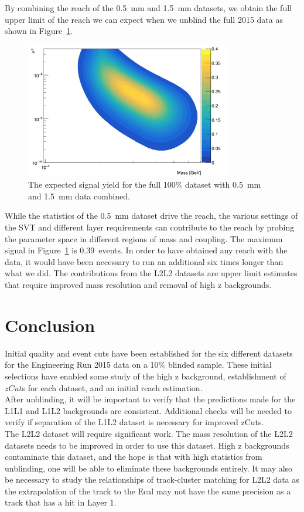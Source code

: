 \documentclass[twoside]{article}
\begin{document}
By combining the reach of the 0.5~mm and 1.5~mm datasets, we obtain the full upper limit of the reach we can expect when we unblind the full 2015 data as shown in Figure~\ref{fig:reachall}.

\begin{figure}[H]
  \centering
     \includegraphics[width=0.8\textwidth]{plots/reachall.png}
  \caption{The expected signal yield for the full 100$\%$ dataset with 0.5~mm and 1.5~mm data combined.}
  \label{fig:reachall}
\end{figure} 

While the statistics of the 0.5~mm dataset drive the reach, the various settings of the SVT and different layer requirements can contribute to the reach by probing the parameter space in different regions of mass and coupling. The maximum signal in  Figure~\ref{fig:reachall} is 0.39~events. In order to have obtained any reach with the data, it would have been necessary to run an additional six times longer than what we did. 
\indent The contributions from the L2L2 datasets are upper limit estimates that require improved mass resolution and removal of high z backgrounds. 


\section{Conclusion}

Initial quality and event cuts have been established for the six different datasets for the Engineering Run 2015 data on a 10$\%$ blinded sample. These initial selections have enabled some study of the high z background, establishment of $zCut$s for each dataset, and an initial reach estimation. \\
\indent After unblinding, it will be important to verify that the predictions made for the L1L1 and L1L2 backgrounds are consistent. Additional checks will be needed to verify if separation of the L1L2 dataset is necessary for improved zCuts. \\
\indent The L2L2 dataset will require significant work. The mass resolution of the L2L2 datasets needs to be improved in order to use this dataset. High z backgrounds contaminate this dataset, and the hope is that with high statistics from unblinding, one will be able to eliminate these backgrounds entirely. It may also be necessary to study the relationships of track-cluster matching for L2L2 data as the extrapolation of the track to the Ecal may not have the same precision as a track that has a hit in Layer 1. 
\end{document}
